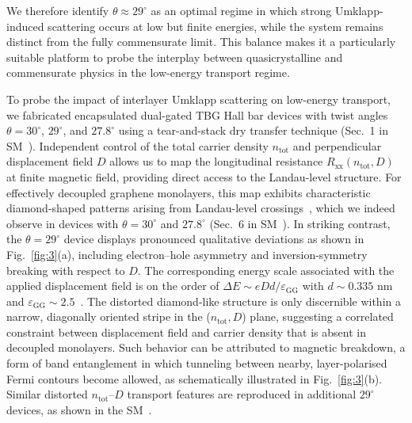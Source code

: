 \documentclass[reprint,
superscriptaddress,amsmath,amssymb,aps,prl]{revtex4-2}
\begin{document}
We therefore identify $\theta \approx 29^\circ$ as an optimal regime in which strong Umklapp-induced scattering occurs at low but finite energies, while the system remains distinct from the fully commensurate limit. This balance makes it a particularly suitable platform to probe the interplay between quasicrystalline and commensurate physics in the low-energy transport regime.




To probe the impact of interlayer Umklapp scattering on low-energy transport, we fabricated encapsulated dual-gated TBG Hall bar devices with twist angles $\theta = 30^\circ$, $29^\circ$, and $27.8^\circ$ using a tear-and-stack dry transfer technique (Sec.~1 in SM~\cite{SI}). Independent control of the total carrier density $n_{\mathrm{tot}}$ and perpendicular displacement field $D$ allows us to map the longitudinal resistance $R_\mathrm{xx}(n_{\mathrm{tot}},D)$ at finite magnetic field, providing direct access to the Landau-level structure. For effectively decoupled graphene monolayers, this map exhibits characteristic diamond-shaped patterns arising from Landau-level crossings~\cite{slizovskiy_out--plane_2021,sanchez2012quantum, kim2021odd, tomic2022scattering}, which we indeed observe in devices with $\theta = 30^\circ$ and $27.8^\circ$  (Sec.~6 in SM~\cite{SI}). In striking contrast, the $\theta = 29^\circ$ device displays pronounced qualitative deviations as shown in Fig.~\ref{fig:3}(a), including electron--hole asymmetry and inversion-symmetry breaking with respect to $D$. The corresponding energy scale associated with the applied displacement field is on the order of $\Delta E \sim e D d / \varepsilon_{\mathrm{GG}}$ with $d \sim 0.335$ nm and $\varepsilon_{\mathrm{GG}} \sim 2.5$~\cite{slizovskiy_out--plane_2021, sanchez2012quantum}. The distorted diamond-like structure is only discernible within a narrow, diagonally oriented stripe in the ($n_\mathrm{tot},D$) plane, suggesting a correlated constraint between displacement field and carrier density that is absent in decoupled monolayers. Such behavior can be attributed to magnetic breakdown, a form of band entanglement in which tunneling between nearby, layer-polarised Fermi contours become allowed, as schematically illustrated in Fig.~\ref{fig:3}(b). Similar distorted $n_\mathrm{tot}$--$D$ transport features are reproduced in additional $29^\circ$ devices, as shown in the SM~\cite{SI}.
\end{document}
